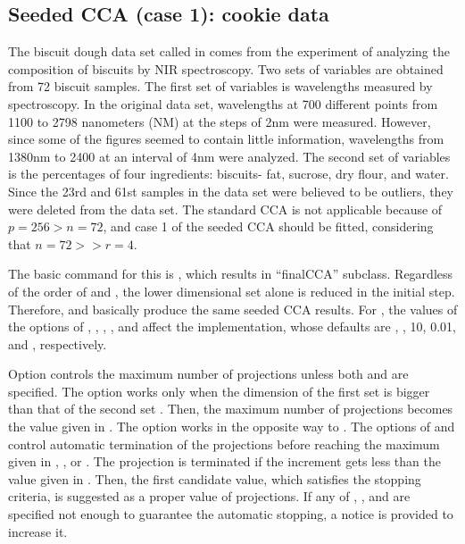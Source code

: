 \subsection{Seeded CCA (case 1): {\sf cookie} data}
The biscuit dough data set called  in 
comes from the experiment of
analyzing the composition of biscuits by NIR spectroscopy.
Two sets of variables are obtained from 72 biscuit samples.
The first set of variables is wavelengths measured by spectroscopy.
In the original data set, wavelengths at 700 different points
from 1100 to 2798 nanometers (NM) at the steps of 2nm were measured.
However, since some of the figures seemed to contain little information,
wavelengths from 1380nm to 2400 at an interval of 4nm were analyzed.
The second set of variables is the percentages of
four ingredients: biscuits- fat, sucrose, dry flour, and water.
Since the 23rd and 61st samples
in the data set were believed to be outliers,
they were deleted from the data set.
The standard CCA is not applicable because of  $p=256>n=72$, and
case 1 of the seeded CCA should be fitted, considering that $n=72>>r=4$.

The basic command for this is ,
which results in ``finalCCA'' subclass.
Regardless of the order of  and ,
the lower dimensional set alone is reduced in the initial step.
Therefore,   and  
basically produce the same seeded CCA results.
For , the values of the options of , , ,
, and  affect the implementation, whose defaults are
, , 10,  0.01, and , respectively.

Option  controls the maximum number of projections 
unless both  and  are specified.
The option  works only when the dimension of the first set 
is bigger than that of the second set .
Then, the maximum number of projections becomes the value given in .
The option  works in the opposite way to .
The options of   and  control
automatic termination of the projections before reaching the maximum given in
, , or .
The projection is terminated if the increment gets less than the value given in .
Then, the first candidate value, which satisfies the stopping criteria,
is suggested as a proper value of projections.
If any of , , and  are specified not enough
to guarantee the automatic stopping,  a notice is provided to increase it.

